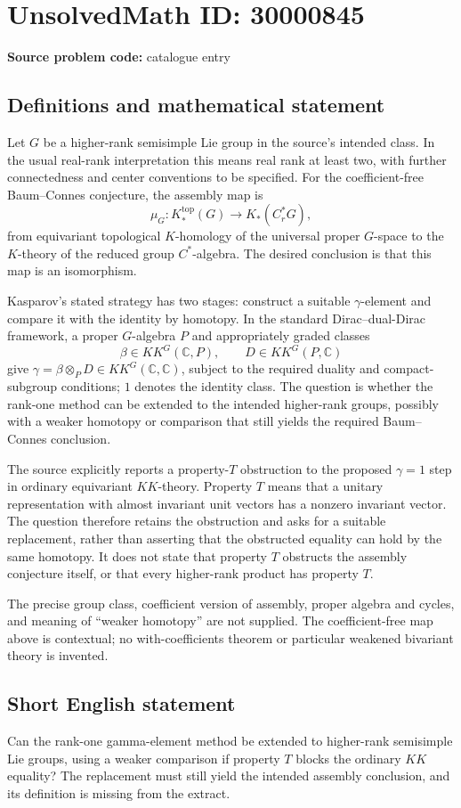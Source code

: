 \documentclass[11pt]{article}
\newcommand{\C}{\mathbb{C}}
\begin{document}
\section*{UnsolvedMath ID: 30000845}
\textbf{Source problem code:} catalogue entry
\subsection{Definitions and mathematical statement}
Let $G$ be a higher-rank semisimple Lie group in the source's intended class. In the usual real-rank interpretation this means real rank at least two, with further connectedness and center conventions to be specified. For the coefficient-free Baum--Connes conjecture, the assembly map is
\[
\mu_G:K_*^{\mathrm{top}}(G)\longrightarrow K_*(C_r^*G),
\]
from equivariant topological $K$-homology of the universal proper $G$-space to the $K$-theory of the reduced group $C^*$-algebra. The desired conclusion is that this map is an isomorphism.

Kasparov's stated strategy has two stages: construct a suitable $\gamma$-element and compare it with the identity by homotopy. In the standard Dirac--dual-Dirac framework, a proper $G$-algebra $P$ and appropriately graded classes
\[
\beta\in KK^G(\C,P),\qquad D\in KK^G(P,\C)
\]
give $\gamma=\beta\otimes_P D\in KK^G(\C,\C)$, subject to the required duality and compact-subgroup conditions; $1$ denotes the identity class. The question is whether the rank-one method can be extended to the intended higher-rank groups, possibly with a weaker homotopy or comparison that still yields the required Baum--Connes conclusion.

The source explicitly reports a property-$T$ obstruction to the proposed $\gamma=1$ step in ordinary equivariant $KK$-theory. Property $T$ means that a unitary representation with almost invariant unit vectors has a nonzero invariant vector. The question therefore retains the obstruction and asks for a suitable replacement, rather than asserting that the obstructed equality can hold by the same homotopy. It does not state that property $T$ obstructs the assembly conjecture itself, or that every higher-rank product has property $T$.

The precise group class, coefficient version of assembly, proper algebra and cycles, and meaning of ``weaker homotopy'' are not supplied. The coefficient-free map above is contextual; no with-coefficients theorem or particular weakened bivariant theory is invented.
\subsection{Short English statement}
Can the rank-one gamma-element method be extended to higher-rank semisimple Lie groups, using a weaker comparison if property $T$ blocks the ordinary $KK$ equality? The replacement must still yield the intended assembly conclusion, and its definition is missing from the extract.
\end{document}

